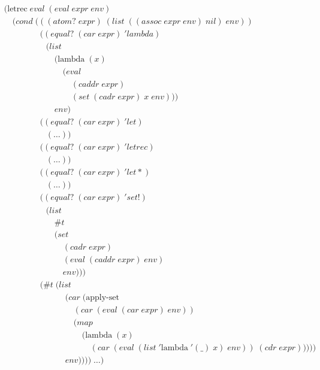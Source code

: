 \begin{align*}
& (\text{letrec} \; eval \; (eval \; expr \; env)
\\& \quad (cond \; (((atom? \; expr) \; (list \; ((assoc \; expr \; env) \; nil) \; env))
\\& \qquad \qquad \; ((equal? \; (car \; expr) \; 'lambda) \; 
\\& \qquad \qquad \quad (list
\\& \qquad \qquad \qquad (\text{lambda} \; (x) \; 
\\& \qquad \qquad \qquad \quad (eval \; 
\\& \qquad \qquad \qquad \qquad (caddr \; expr) \; 
\\& \qquad \qquad \qquad \qquad (set \; (cadr \; expr) \; x \; env)))
\\& \qquad \qquad \qquad env)
\\& \qquad \qquad \; ((equal? \; (car \; expr) \; 'let)
\\& \qquad \qquad \quad (\dots))
\\& \qquad \qquad \; ((equal? \; (car \; expr) \; 'letrec)
\\& \qquad \qquad \quad (\dots))
\\& \qquad \qquad \; ((equal? \; (car \; expr) \; 'let*) \; 
\\& \qquad \qquad \quad (\dots))
\\& \qquad \qquad \; ((equal? \; (car \; expr) \; 'set!)
\\& \qquad \qquad \quad (list \; 
\\& \qquad \qquad \qquad \#t \; 
\\& \qquad \qquad \qquad (set \; 
\\& \qquad \qquad \qquad \quad (cadr \; expr) \; 
\\& \qquad \qquad \qquad \quad (eval \; (caddr \; expr) \; env) \; 
\\& \qquad \qquad \qquad \quad env)))
\\& \qquad \qquad \; (\#t \; (list
\\& \qquad \qquad \qquad \quad \; (car \; (\text{apply-set} \; 
\\& \qquad \qquad \qquad \qquad \; (car \; (eval \; (car \; expr) \; env))
\\& \qquad \qquad \qquad \qquad \; (map \; 
\\& \qquad \qquad \qquad \qquad \quad \; (\text{lambda} \; (x) \; 
\\& \qquad \qquad \qquad \qquad \qquad \; (car \; (eval \; (list \; '\text{lambda} \; '(\_) \; x) \; env)) \; (cdr \; expr)))))
\\& \qquad \qquad \qquad \quad \; env)))) \; \dots)
\end{align*}

